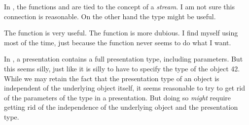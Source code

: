 In \climtwo{}, the functions  and  are tied
to the concept of a \climtwo{} \emph{stream}.  I am not sure this
connection is reasonable.  On the other hand the  type
might be useful. 

The \climtwo{} function  is very useful.  The function
 is more dubious.  I find myself using
 most of the time, just because the
function  never seems to do what I want. 

In \climtwo{}, a presentation contains a full presentation type,
including parameters.  But this seems silly, just like it is silly to
have to specify the type of the \cl{} object 42.  While we may retain
the fact that the presentation type of an object is independent of the
underlying object itself, it seems reasonable to try to get rid of the
parameters of the type in a presentation.  But doing so \emph{might}
require getting rid of the independence of the underlying object and
the presentation type.
